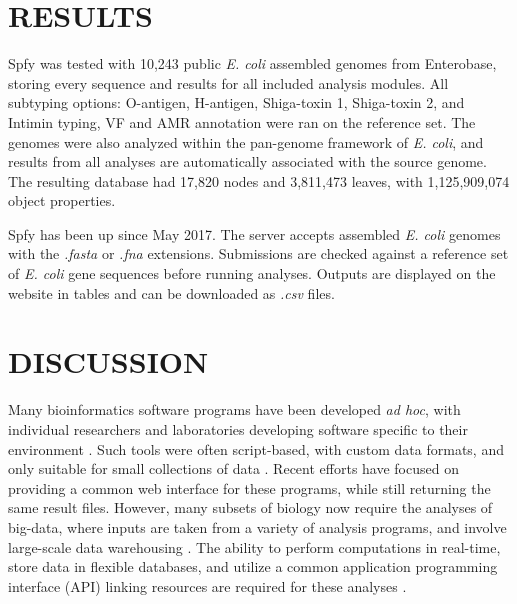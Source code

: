\documentclass{article}
\begin{document}
\section{RESULTS}
Spfy was tested with 10,243 public \textit{E. coli} assembled genomes from Enterobase, storing every sequence and results for all included analysis modules.
All subtyping options: O-antigen, H-antigen, Shiga-toxin 1, Shiga-toxin 2, and Intimin typing, VF and AMR annotation were ran on the reference set. The genomes were also analyzed within the pan-genome framework of \textit{E. coli}, and results from all analyses are automatically associated with the source genome.
The resulting database had 17,820 nodes and 3,811,473 leaves, with 1,125,909,074 object properties. \par

\small 

Spfy has been up since May 2017. The server accepts assembled \textit{E. coli} genomes with the \textit{.fasta} or \textit{.fna} extensions. Submissions are checked against a reference set of \textit{E. coli} gene sequences before running analyses. Outputs are displayed on the website in tables and can be downloaded as \textit{.csv} files. 
\par


\section{DISCUSSION}

Many bioinformatics software programs have been developed \textit{ad hoc}, with individual researchers and laboratories developing software specific to their environment \cite{de2015trends}.
Such tools were often script-based, with custom data formats, and only suitable for small collections of data \cite{de2015trends}.
Recent efforts \cite{goecks2010galaxy,thomsen2016bacterial} have focused on providing a common web interface for these programs, while still returning the same result files.
However, many subsets of biology now require the analyses of big-data, where inputs are taken from a variety of analysis programs, and involve large-scale data warehousing \cite{schatz2015biological}.
The ability to perform computations in real-time, store data in flexible databases, and utilize a common application programming interface (API) linking resources are required for these analyses \cite{swaminathan2016review}.
\end{document}
